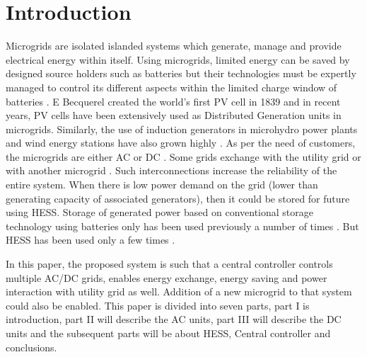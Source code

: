 \documentclass[journal,twoside]{IEEEtran}
\begin{document}
\section{Introduction}
Microgrids are isolated islanded systems which generate, manage and provide electrical energy within itself. Using microgrids, limited energy can be saved by designed source holders such as batteries but their technologies must be expertly managed to control its different aspects within the limited charge window of batteries \cite{Arnold2050}. E Becquerel created the world's first PV cell in 1839 \cite{Zamostny2013}  and in recent years, PV cells have been extensively used as Distributed Generation units in microgrids. Similarly, the use of induction generators in microhydro power plants and wind energy stations have also grown highly \cite{Liu2015}. As per the need of customers, the microgrids are either AC \cite{Liu2015} or DC \cite{Chen2015, Piagi2006, Lee2015, Madduri2015} . 
Some grids exchange with the utility grid \cite{Chen2015}  or with another microgrid \cite{Lee2015}. Such interconnections increase the reliability of the entire system. When there is low power demand on the grid (lower than generating capacity of associated generators), then it could be stored for future using HESS. Storage of generated power based on conventional storage technology using batteries only has been used previously a number of times \cite{Lee2015, Madduri2015, Vosoloo2050, Zenned2015, Latreche2015, Yahyaoui2015, Khaldi2015} . But HESS has been used only a few times \cite{Piagi2006, Lee2015, Khaldi2015}. 

\bigskip
In this paper, the proposed system is such that a central controller controls multiple AC/DC grids, enables energy exchange, energy saving and power interaction with utility grid as well. Addition of a new microgrid to that system could also be enabled. This paper is divided into seven parts, part I is introduction, part II will describe the AC units, part III will describe the DC units and the subsequent parts will be about HESS, Central controller and conclusions.
\end{document}

